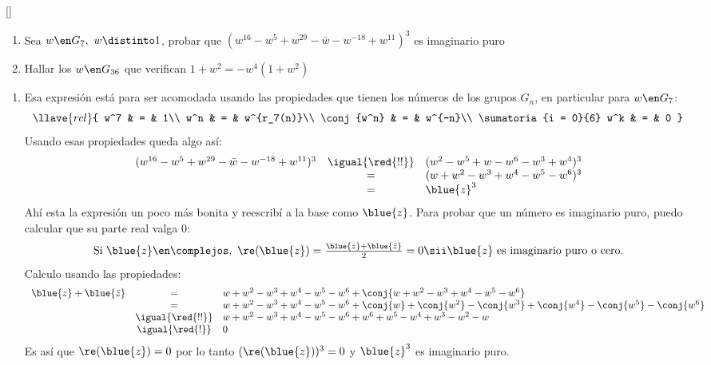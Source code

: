 \begin{enunciado}{\ejExtra}{\tiny[]}
  \begin{enumerate}[label=(\alph*)]
    \item Sea $w \en G_7, ~ w \distinto 1$, probar que
          $(w^{16} - w^5 + w^{29} - \bar{w} - w^{-18} + w^{11})^3$
          es imaginario puro

    \item Hallar los $w \en G_{36}$ que verifican $1 + w^2 = - w^4(1 + w^2)$
  \end{enumerate}
\end{enunciado}

\begin{enumerate}[label=(\alph*)]
  \item Esa expresión está para ser acomodada usando las propiedades que tienen los números de los grupos $G_n$,
        en particular para $w \en G_7$:
        $$
          \llave{rcl}{
            w^7 & = & 1\\
            w^n & = & w^{r_7(n)}\\
            \conj{w^n} & = & w^{-n}\\
            \sumatoria{i = 0}{6} w^k & = & 0
          }
        $$
        Usando esas propiedades queda algo así:
        $$
          \begin{array}{rcl}
            (w^{16} - w^5 + w^{29} - \bar{w} - w^{-18} + w^{11})^3
             & \igual{\red{!!}} &
            (w^2 - w^5 + w - w^6 - w^3 + w^4)^3 \\
             & =                &
            (w + w^2 - w^3 + w^4 - w^5 - w^6)^3 \\
             & =                &
            \blue{z}^3                          \\
          \end{array}
        $$
        Ahí esta la expresión un poco más bonita y reescribí a la base como $\blue{z}$. Para probar que un número es imaginario puro,
        puedo calcular que su parte real valga 0:
        $$
          \textstyle
          \text{Si } \blue{z} \en \complejos,~ \re(\blue{z}) = \frac{\blue{z} + \blue{\bar{z}}}{2} = 0
          \sii
          \blue{z} \text{ es imaginario puro o cero}.
        $$
        Calculo usando las propiedades:
        $$
          \begin{array}{rcl}
            \blue{z} + \blue{\bar{z}}
             & =                &
            w + w^2 - w^3 + w^4 - w^5 - w^6 + \conj{w + w^2 - w^3 + w^4 - w^5 - w^6}                                    \\
             & =                &
            w + w^2 - w^3 + w^4 - w^5 - w^6 + \conj{w} + \conj{w^2} - \conj{w^3} + \conj{w^4} - \conj{w^5} - \conj{w^6} \\
             & \igual{\red{!!}} &
            w + w^2 - w^3 + w^4 - w^5 - w^6 + w^6 + w^5 - w^4 + w^3 - w^2 - w                                           \\
             & \igual{\red{!}}  &
            0
          \end{array}
        $$
        Es así que $\re(\blue{z}) = 0$ por lo tanto $(\re(\blue{z}))^3 = 0$ y $\blue{z}^3$ es imaginario puro.


\end{enumerate}
